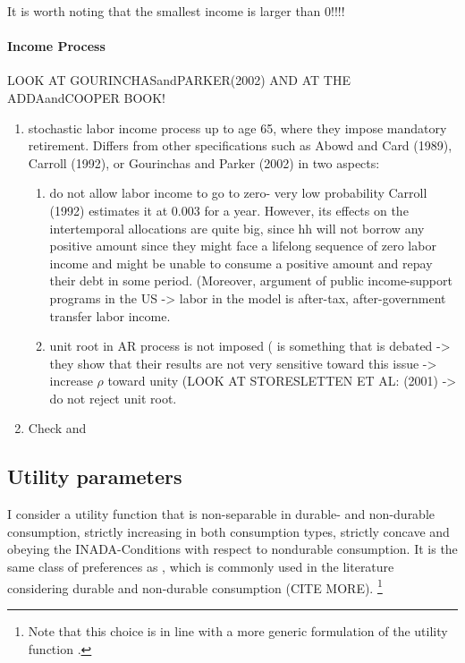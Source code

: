 \documentclass[a4paper,12pt]{article}
\begin{document}
It is worth noting that the smallest income is larger than 0!!!! 

\paragraph{Income Process}

LOOK AT GOURINCHASandPARKER(2002) AND AT THE ADDAandCOOPER BOOK! 

\begin{enumerate}
\item \citep{FV&K2011} stochastic labor income process up to age 65, where they impose mandatory retirement. Differs from other specifications such as Abowd and Card (1989), Carroll (1992), or Gourinchas and Parker (2002) in two aspects: 
\begin{enumerate}
\item do not allow labor income to go to zero- very low probability Carroll (1992) estimates it at 0.003 for a year. However, its effects on the intertemporal allocations are quite big, since hh will not borrow any positive amount since they might face a lifelong sequence of zero labor income and might be unable to consume a positive amount and repay their debt in some period. (Moreover, argument of public income-support programs in the US -> labor in the model is after-tax, after-government transfer labor income.
\item unit root in AR process is not imposed  ( is something that is debated -> they show that their results are not very sensitive toward this issue -> increase $\rho$ toward unity (LOOK AT STORESLETTEN ET AL: (2001) -> do not reject unit root.
\end{enumerate} 
\item Check \cite{hintermaier2010} and \cite{hintermaier2011}
\end{enumerate}

\subsection{Utility parameters}

I consider a utility function that is non-separable in durable- and non-durable consumption, strictly increasing in both consumption types, strictly concave and obeying the INADA-Conditions with respect to nondurable consumption. It is the same class of preferences as \cite{hintermaier2010}, which is commonly used in the literature considering durable and non-durable consumption (CITE MORE). \footnote{Note that this choice is in line with a more generic formulation of the utility function \citep{FV&K2011}.}
\end{document}
